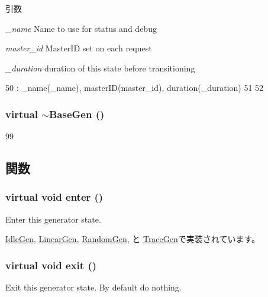 \begin{DoxyParams}{引数}
\item[{\em \_\-name}]Name to use for status and debug \item[{\em master\_\-id}]MasterID set on each request \item[{\em \_\-duration}]duration of this state before transitioning \end{DoxyParams}



\begin{DoxyCode}
50     : _name(_name), masterID(master_id), duration(_duration)
51 {
52 }
\end{DoxyCode}
\hypertarget{classBaseGen_a5b9bfeec43cf896304459480991317b4}{
\subsubsection[{$\sim$BaseGen}]{\setlength{\rightskip}{0pt plus 5cm}virtual $\sim${\bf BaseGen} ()}}
\label{classBaseGen_a5b9bfeec43cf896304459480991317b4}



\begin{DoxyCode}
99 { }
\end{DoxyCode}


\subsection{関数}
\hypertarget{classBaseGen_ac51895063c53dfbc0f47a01940a3aa05}{
\subsubsection[{enter}]{\setlength{\rightskip}{0pt plus 5cm}virtual void enter ()}}
\label{classBaseGen_ac51895063c53dfbc0f47a01940a3aa05}
Enter this generator state. 

\hyperlink{classIdleGen_a2759dad6560aaf485b16356d7142d69d}{IdleGen}, \hyperlink{classLinearGen_a2759dad6560aaf485b16356d7142d69d}{LinearGen}, \hyperlink{classRandomGen_a2759dad6560aaf485b16356d7142d69d}{RandomGen}, と \hyperlink{classTraceGen_a2759dad6560aaf485b16356d7142d69d}{TraceGen}で実装されています。\hypertarget{classBaseGen_acbd8338aaa3340f10faecd6d2f759324}{
\subsubsection[{exit}]{\setlength{\rightskip}{0pt plus 5cm}virtual void exit ()}}
\label{classBaseGen_acbd8338aaa3340f10faecd6d2f759324}
Exit this generator state. By default do nothing. 


